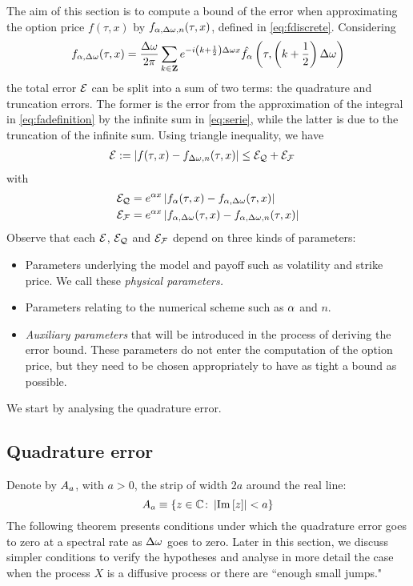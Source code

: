 \documentclass[11pt]{amsart}
\begin{document}
The aim of this section is to compute a bound of the error when approximating 
the option price $f(\tau,x)$ by $f_{\alpha, \Delta\omega,n} (\tau,x)$,
defined in \eqref{eq:fdiscrete}.
Considering
\begin{equation} \label{eq:serie}
f_{\alpha, \Delta\omega}(\tau,x)= \frac{\Delta\omega}{2\pi} \sum_{k\in \mathbf{Z}} e^{-i{\left( {k+\frac12} \right)\Delta\omega} x} \hat{f_{\alpha}}\left( {\tau,{\left( {k+\frac12} \right)\Delta\omega}} \right)
\end{equation}
the total error $\mathcal{E}$ can be split into a sum of two terms: the quadrature and truncation errors.
The former is the error from the approximation of the integral in \eqref{eq:fadefinition}
by the infinite sum in \eqref{eq:serie}, while the latter is due to the truncation of the infinite sum. 
Using triangle inequality, we have
\begin{align} \label{eq:errordef}
\mathcal{E} &:=\left| {f(\tau,x)-f_{\Delta\omega,n}(\tau,x)} \right|\leq \mathcal{E_Q} + \mathcal{E_F}
\end{align}
with
\begin{align*}
\mathcal{E_Q} &= e^{\alpha x}\left| {f_{\alpha}(\tau,x)-f_{\alpha, \Delta\omega}(\tau,x)} \right|\\
\mathcal{E_F} &= e^{\alpha x} \left| {f_{\alpha, \Delta\omega}(\tau,x)-f_{\alpha, \Delta\omega,n}(\tau,x)} \right|
\end{align*}
Observe that each $\mathcal{E}$, $\mathcal{E_Q}$ and $\mathcal{E_F}$ depend on
three kinds of parameters:
\begin{itemize}
 \item Parameters underlying the model and payoff such as volatility and strike price. We call these \emph{physical parameters.}
 \item Parameters relating to the numerical scheme such as $\alpha$ and $n$.
 \item \emph{Auxiliary parameters} that will be introduced in the process of deriving the error bound. These parameters
 do not enter the computation of the option price, 
 but they need to be chosen appropriately to have as tight a bound as possible. 
\end{itemize}

We start by analysing the quadrature error.
\subsection{Quadrature error}

Denote by $A_{a}$, with $a>0$, the strip of width $2a$ around the real line:
$$A_{a} \equiv \left\{z\in \mathbb{C} \colon \left| {\mathrm{Im}\left[z\right]} \right|<a \right\}$$
The following theorem presents conditions under which the quadrature error goes to zero at a spectral rate as $\Delta\omega$ goes to zero.
Later in this section, we discuss simpler conditions to verify the hypotheses and analyse in more detail the case 
when the process $X$ is a diffusive process or there are ``enough small jumps."
\end{document}

